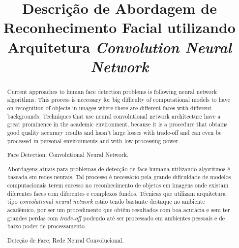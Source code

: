 \documentclass[10pt, conference]{IEEEtran}
\begin{document}
\title{Descrição de Abordagem de Reconhecimento Facial utilizando Arquitetura \textit{Convolution Neural Network}}

\newif\iffinal
\finaltrue
\newcommand{\jemsid}{99999}


\iffinal
  \author{%
  }
\else
  \author{Sibgrapi paper ID: \jemsid \\ }
\fi

\maketitle



\begin{abstract}
	Current approaches to human face detection problems is following neural network algorithms. This process is necessary for big difficulty of computational models to have on recognition of objects in images where there are different faces with different backgrounds. Techniques that use neural convolutional network architecture have a great prominence in the academic environment, because it is a procedure that obtains good quality accuracy results and hasn't large losses with trade-off and can even be processed in personal environments and with low processing power.

	\begin{IEEEkeywords}
		Face Detection; Convolutional Neural Network.
	\end{IEEEkeywords}
\end{abstract}


\begin{abstract}
	Abordagens atuais para problemas de detecção de face humana utilizando algoritmos é baseada em redes neurais. Tal processo é necessário pela grande dificuldade de modelos computacionais terem sucesso no reconhecimento de objetos em imagens onde existam diferentes faces com diferentes e complexos fundos. Técnicas que utilizam arquitetura tipo \textit{convolutional neural network} estão tendo bastante destaque no ambiente acadêmico, por ser um procedimento que obtêm resultados com boa acurácia e sem ter grandes perdas com \textit{trade-off} podendo até ser processado em ambientes pessoais e de baixo poder de processamento.

	\begin{IEEEkeywords}
		Deteção de Face; Rede Neural Convolucional.
	\end{IEEEkeywords}
\end{abstract}
\end{document}
